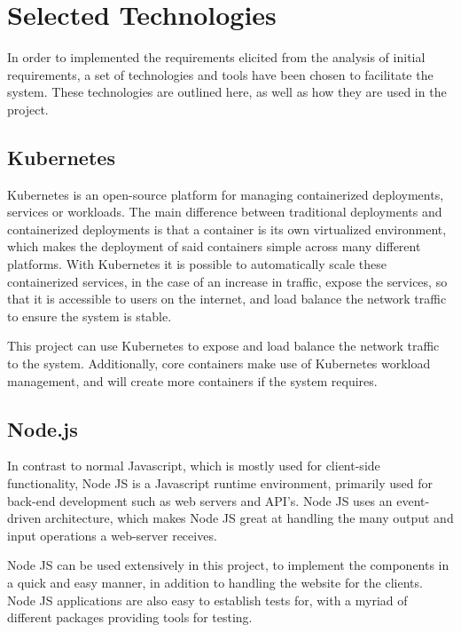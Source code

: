 \section{Selected Technologies}

In order to implemented the requirements elicited from the analysis of initial requirements, a set of technologies and tools have been chosen to facilitate the system. These technologies are outlined here, as well as how they are used in the project.

\subsection{Kubernetes}

Kubernetes is an open-source platform for managing containerized deployments, services or workloads. The main difference between traditional deployments and containerized deployments is that a container is its own virtualized environment, which makes the deployment of said containers simple across many different platforms. With Kubernetes it is possible to automatically scale these containerized services, in the case of an increase in traffic, expose the services, so that it is accessible to users on the internet, and load balance the network traffic to ensure the system is stable. \cite{kubernetes}

This project can use Kubernetes to expose and load balance the network traffic to the system. Additionally, core containers make use of Kubernetes workload management, and will create more containers if the system requires. 

\subsection{Node.js}

In contrast to normal Javascript, which is mostly used for client-side functionality, Node JS is a Javascript runtime environment, primarily used for back-end development such as web servers and API’s. Node JS uses an event-driven architecture, which makes Node JS great at handling the many output and input operations a web-server receives.\cite{nodejs}

Node JS can be used extensively in this project, to implement the components in a quick and easy manner, in addition to handling the website for the clients. Node JS applications are also easy to establish tests for, with a myriad of different packages providing tools for testing.

